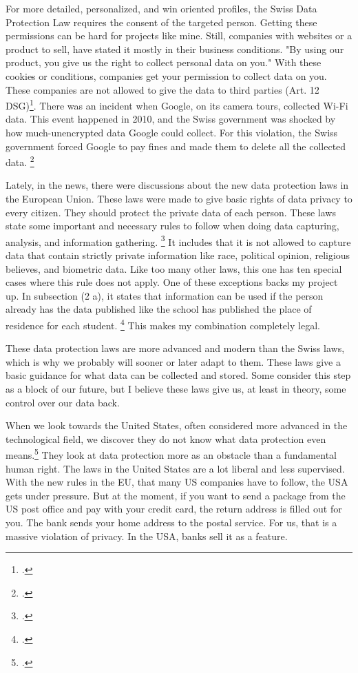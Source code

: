 \documentclass[paper=a4, fontsize=11pt]{article}
\begin{document}
For more detailed, personalized, and win oriented profiles, the Swiss Data Protection Law requires the consent of the targeted person. Getting these permissions can be hard for projects like mine. Still, companies with websites or a product to sell, have stated it mostly in their business conditions. "By using our product, you give us the right to collect personal data on you."
With these cookies or conditions, companies get your permission to collect data on you. These companies are not allowed to give the data to third parties (Art. 12 DSG)\footcite{swissdataprotection}. There was an incident when Google, on its camera tours, collected Wi-Fi data. This event happened in 2010, and the Swiss government was shocked by how much-unencrypted data Google could collect. For this violation, the Swiss government forced Google to pay fines and made them to delete all the collected data. \footcite{googleadmin}


Lately, in the news, there were discussions about the new data protection laws in the European Union. These laws were made to give basic rights of data privacy to every citizen. They should protect the private data of each person. These laws state some important and necessary rules to follow when doing data capturing, analysis, and information gathering. \footcite{dsgvo}
It includes that it is not allowed to capture data that contain strictly private information like race, political opinion, religious believes, and biometric data. Like too many other laws, this one has ten special cases where this rule does not apply. One of these exceptions backs my project up. In subsection (2 a), it states that information can be used if the person already has the data published like the school has published the place of residence for each student. \footcite{dsgvoart9}
This makes my combination completely legal.

These data protection laws are more advanced and modern than the Swiss laws, which is why we probably will sooner or later adapt to them. These laws give a basic guidance for what data can be collected and stored. Some consider this step as a block of our future, but I believe these laws give us, at least in theory, some control over our data back.

When we look towards the United States, often considered more advanced in the technological field, we discover they do not know what data protection even means.\footcite{usdataprotection} They look at data protection more as an obstacle than a fundamental human right.
The laws in the United States are a lot liberal and less supervised. With the new rules in the EU, that many US companies have to follow, the USA gets under pressure. But at the moment, if you want to send a package from the US post office and pay with your credit card, the return address is filled out for you. The bank sends your home address to the postal service. For us, that is a massive violation of privacy. In the USA, banks sell it as a feature.
\end{document}
